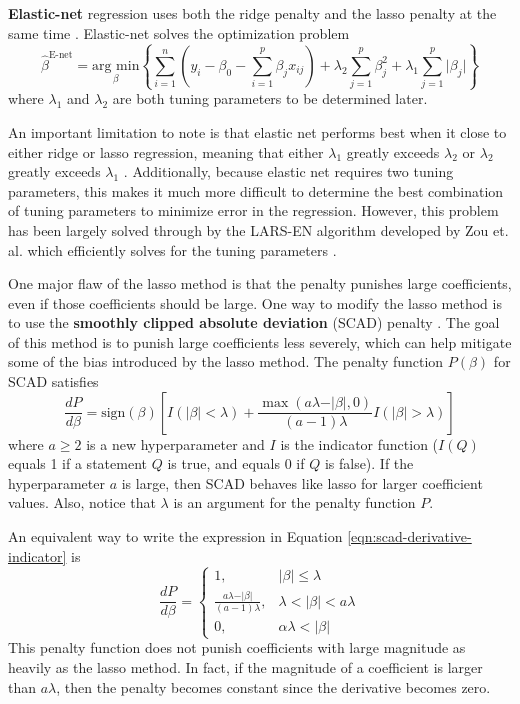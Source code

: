 \documentclass{article}
\newcommand{\argmin}[2]{\underset{#1}{\text{arg min}}\left\{#2\right\}}
\newcommand{\sign}{\text{sign}}
\begin{document}
\textbf{Elastic-net} regression uses both the ridge penalty and the lasso penalty at the same time \cite{zou2005regularization}. Elastic-net solves the optimization problem
\begin{equation}
	\hat{\beta}^{\text{E-net}}=\argmin{\beta}{\sum\limits_{i = 1}^n \left( y_i - \beta_0 - \sum\limits_{i = 1}^p \beta_j x_{ij} \right) + \lambda_2\sum\limits_{j = 1}^p \beta_j^2 + \lambda_1\sum\limits_{j = 1}^p \vert \beta_j \vert}
\end{equation}
where $\lambda_1$ and $\lambda_2$ are both tuning parameters to be determined later.

An important limitation to note is that elastic net performs best when it close to either ridge or lasso regression, meaning that either $\lambda_1$ greatly exceeds $\lambda_2$ or $\lambda_2$ greatly exceeds $\lambda_1$ \cite{zou2005regularization}. Additionally, because elastic net requires two tuning parameters, this makes it much more difficult to determine the best combination of tuning parameters to minimize error in the regression. However, this problem has been largely solved through by the LARS-EN algorithm developed by Zou et. al. which efficiently solves for the tuning parameters \cite{zou2005regularization}.

One major flaw of the lasso method is that the penalty punishes large coefficients, even if those coefficients should be large. One way to modify the lasso method is to use the \textbf{smoothly clipped absolute deviation} (SCAD) penalty \cite{fan2001variable}. The goal of this method is to punish large coefficients less severely, which can help mitigate some of the bias introduced by the lasso method. The penalty function $P(\beta)$ for SCAD satisfies
\begin{equation}\label{eqn:scad-derivative-indicator}
	\frac{dP}{d\beta} = \sign(\beta)\left[ I(\vert \beta \vert<\lambda) + \frac{\max(a\lambda - \vert \beta\vert, 0)}{(a - 1)\lambda}I(\vert \beta \vert > \lambda) \right]
\end{equation}
where $a\geq 2$ is a new hyperparameter and $I$ is the indicator function ($I(Q)$ equals 1 if a statement $Q$ is true, and equals 0 if $Q$ is false). If the hyperparameter $a$ is large, then SCAD behaves like lasso for larger coefficient values. Also, notice that $\lambda$ is an argument for the penalty function $P$.

An equivalent way to write the expression in Equation \ref{eqn:scad-derivative-indicator} is
\begin{equation}
	\frac{dP}{d\beta} = \left\{\begin{array}{ll}
		1,&\vert \beta \vert\leq \lambda\\
		\frac{a\lambda - \vert \beta \vert}{(a - 1)\lambda},&\lambda < \vert \beta \vert < a\lambda\\
		0,&\alpha\lambda < \vert \beta \vert
	\end{array}\right.
\end{equation}
This penalty function does not punish coefficients with large magnitude as heavily as the lasso method. In fact, if the magnitude of a coefficient is larger than $a\lambda$, then the penalty becomes constant since the derivative becomes zero.
\end{document}
